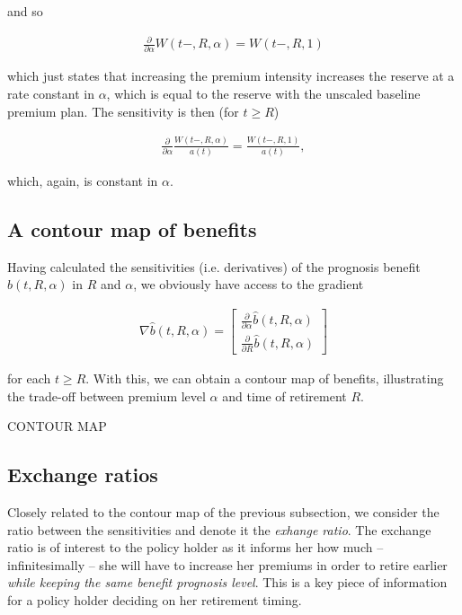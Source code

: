 \documentclass{book}
\newcommand{\1}[1]{\mathbbm{1}_{\left\lbrace #1 \right\rbrace}}
\theoremstyle{break}
\theoremstyle{remark}
\numberwithin{equation}{section}
\begin{document}
and so

\begin{align} \label{AlphaDeriv}
	\frac{\partial}{\partial \alpha }W(t-,R,\alpha) = W(t-,R,1)
\end{align}

which just states that increasing the premium intensity increases the reserve at a rate constant in $\alpha$, which is equal to the reserve with the unscaled baseline premium plan. The sensitivity is then (for $t \geq R$)

\begin{align} \label{ResDeriv}
	\frac{\partial}{\partial \alpha }\frac{W(t-,R,\alpha)}{a(t)} = \frac{W(t-,R,1)}{a(t)},
\end{align}

which, again, is constant in $\alpha$.

\subsection{A contour map of benefits}

Having calculated the sensitivities (i.e. derivatives) of the prognosis benefit $\hat{b}(t,R,\alpha)$ in $R$ and $\alpha$, we obviously have access to the gradient

\begin{align*}
	\nabla \hat{b}(t,R,\alpha) =
	\begin{bmatrix}
		\frac{\partial}{\partial \alpha }\hat{b}(t,R,\alpha) \\
		\frac{\partial}{\partial R }\hat{b}(t,R,\alpha)
	\end{bmatrix}
\end{align*}

for each $t \geq R$. With this, we can obtain a contour map of benefits, illustrating the trade-off between premium level $\alpha$ and time of retirement $R$.

CONTOUR MAP

\subsection{Exchange ratios}

Closely related to the contour map of the previous subsection, we consider the ratio between the sensitivities and denote it the \textit{exhange ratio}. The exchange ratio is of interest to the policy holder as it informs her how much -- infinitesimally -- she will have to increase her premiums in order to retire earlier \textit{while keeping the same benefit prognosis level}. This is a key piece of information for a policy holder deciding on her retirement timing.
\end{document}
